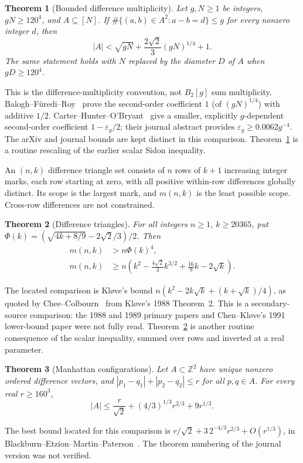 \documentclass[10pt]{article}
\numberwithin{equation}{section}
\newtheorem{theorem}{Theorem}[section]
\theoremstyle{remark}
\newcommand{\Z}{\mathbb Z}
\newcommand{\gam}{\frac{2\sqrt2}{3}}
\begin{document}
\begin{theorem}[Bounded difference multiplicity]\label{thm:gthin}
Let $g,N\ge1$ be integers, $gN\ge120^4$, and $A\subseteq[N]$. If
$\#\{(a,b)\in A^2:a-b=d\}\le g$ for every nonzero integer $d$, then
\begin{equation}\label{eq:gthin}
 |A|<\sqrt{gN}+\gam(gN)^{1/4}+1.
\end{equation}
The same statement holds with $N$ replaced by the diameter $D$ of $A$
when $gD\ge120^4$.
\end{theorem}
This is the difference-multiplicity convention, not $B_2[g]$ sum
multiplicity. Balogh--F\"uredi--Roy~\cite[Section~6, (6.1)]{BFR21}
prove the second-order coefficient $1$ (of $(gN)^{1/4}$) with additive $1/2$.
Carter--Hunter--O'Bryant~\cite{CHO25} give a smaller, explicitly
$g$-dependent second-order coefficient $1-\varepsilon_g/2$; their journal abstract
provides $\varepsilon_g\ge0.0062g^{-4}$. The arXiv and journal bounds
are kept distinct in this comparison. Theorem~\ref{thm:gthin} is a
routine rescaling of the earlier scalar Sidon inequality.

An $(n,k)$ difference triangle set consists of $n$ rows of $k+1$
increasing integer marks, each row starting at zero, with all positive
within-row differences globally distinct. Its scope is the largest
mark, and $m(n,k)$ is the least possible scope. Cross-row differences
are not constrained.
\begin{theorem}[Difference triangles]\label{thm:dts}
For all integers $n\ge1$, $k\ge20365$, put
$\Phi(k)=(\sqrt{4k+8/9}-2\sqrt2/3)/2$. Then
\begin{align}
 m(n,k)&>n\Phi(k)^4,\label{eq:dts-inverse}\\
 m(n,k)&\ge n\left(k^2-\frac{4\sqrt2}{3}k^{3/2}
                      +\frac{16}{9}k-2\sqrt k\right).\label{eq:dts-expanded}
\end{align}
\end{theorem}
The located comparison is Kl\o ve's bound
$n(k^2-2k\sqrt k+(k+\sqrt k)/4)$, as quoted by
Chee--Colbourn~\cite[Theorem~1]{CC97} from Kl\o ve's 1988 Theorem~2.
This is a secondary-source comparison: the 1988 and 1989 primary
papers and Chen--Kl\o ve's 1991 lower-bound paper were not fully read.
Theorem~\ref{thm:dts} is another routine consequence of the scalar
inequality, summed over rows and inverted at a real parameter.

\begin{theorem}[Manhattan configurations]\label{thm:manhattan}
Let $A\subset\Z^2$ have unique nonzero ordered difference vectors,
and $|p_1-q_1|+|p_2-q_2|\le r$ for all $p,q\in A$.
For every real $r\ge160^3$,
\begin{equation}\label{eq:manhattan}
 |A|\le\frac r{\sqrt2}+(4/3)^{1/3}r^{2/3}+9r^{1/3}.
\end{equation}
\end{theorem}
The best bound located for this comparison is
$r/\sqrt2+3\,2^{-4/3}r^{2/3}+O(r^{1/3})$, in
Blackburn--Etzion--Martin--Paterson~\cite[Theorem~9, arXiv version~2]{BEMP10}.
The theorem numbering of the journal version was not verified.
\end{document}
